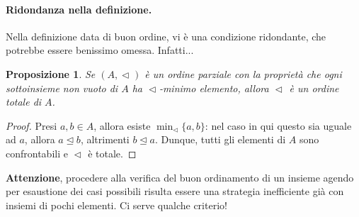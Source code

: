 \documentclass[fontsize = 11 pt, paper=A4, oneside, index=totoc, hyperref]{article}
\theoremstyle{definition}
\theoremstyle{plain}
\newtheorem{prp}{Proposizione}[section]
\newcommand{\order}{\vartriangleleft}
\newcommand{\ordine}[1]{\vartriangleleft_{\mathrm{#1}}}
\begin{document}
\paragraph{Ridondanza nella definizione.} Nella definizione data di buon ordine, vi è una condizione ridondante, che potrebbe essere benissimo omessa. Infatti...
\begin{prp}
  Se \((A, \ordine{})\) è un ordine parziale con la proprietà che ogni sottoinsieme non vuoto di \(A\) ha \(\ordine{}\)-minimo elemento, allora \(\ordine{}\) è un ordine totale di \(A\).
\end{prp}
\begin{proof}
  Presi \(a,b \in A\), allora esiste \(\min_\order \lbrace a,b \rbrace\): nel caso in qui questo sia uguale ad \(a\), allora \(a \trianglelefteq b\), altrimenti \(b \trianglelefteq a\). Dunque, tutti gli elementi di \(A\) sono confrontabili e \(\ordine{}\) è totale.
\end{proof}

{\bf Attenzione}, procedere alla verifica del buon ordinamento di un insieme agendo per esaustione dei casi possibili risulta essere una strategia inefficiente già con insiemi di pochi elementi. Ci serve qualche criterio!
\end{document}

